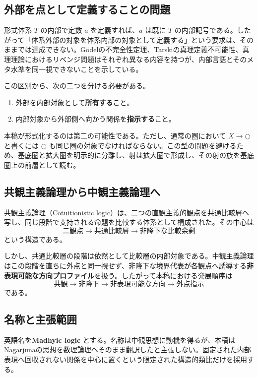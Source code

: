 \documentclass[a4paper,11pt]{ltjsarticle}
\theoremstyle{definition}
\theoremstyle{plain}
\newcommand{\dfix}{\bigcirc}
\begin{document}
\subsection{外部を点として定義することの問題}

形式体系 $T$ の内部で定数 $a$ を定義すれば、$a$ は既に $T$ の内部記号である。したがって「体系外部の対象を体系内部の対象として定義する」という要求は、そのままでは達成できない。Gödelの不完全性定理、Tarskiの真理定義不可能性、真理理論におけるリベンジ問題はそれぞれ異なる内容を持つが、内部言語とそのメタ水準を同一視できないことを示している\cite{godel,tarski,kripke,Beall2007}。

この区別から、次の二つを分ける必要がある。
\begin{enumerate}
 \item 外部を内部対象として\textbf{所有する}こと。
 \item 内部対象から外部側へ向かう関係を\textbf{指示する}こと。
\end{enumerate}

本稿が形式化するのは第二の可能性である。ただし、通常の圏において $X\to\dfix$ と書くには $\dfix$ も同じ圏の対象でなければならない。この型の問題を避けるため、基底圏と拡大圏を明示的に分離し、射は拡大圏で形成し、その射の族を基底圏上の前層として読む。

\subsection{共観主義論理から中観主義論理へ}

共観主義論理（Cotuitionistic logic）は、二つの直観主義的観点を共通比較層へ写し、同じ段階で支持される命題を比較する体系として構成された\cite{ChibaCotuition2026}。その中心は
\[
 \text{二観点}
 \longrightarrow
 \text{共通比較層}
 \longrightarrow
 \text{非降下な比較余剰}
\]
という構造である。

しかし、共通比較層の段階は依然として比較層の内部対象である。中観主義論理はこの段階を直ちに外点と同一視せず、非降下な境界代表が各観点へ誘導する\textbf{非表現可能な方向プロファイル}を扱う。したがって本稿における発展順序は
\[
 \text{共観}
 \longrightarrow
 \text{非降下}
 \longrightarrow
 \text{非表現可能な方向}
 \longrightarrow
 \text{外点指示}
\]
である。

\subsection{名称と主張範囲}

英語名を\textbf{Madhyic logic} とする。名称は中観思想に動機を得るが、本稿はNāgārjunaの思想を数理論理へそのまま翻訳したと主張しない\cite{Garfield1995,Westerhoff2009}。固定された内部表現へ回収されない関係を中心に置くという限定された構造的類比だけを採用する。
\end{document}
